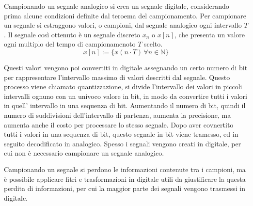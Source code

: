 \documentclass{article}
\numberwithin{equation}{subsection}
\begin{document}
Campionando un segnale analogico si crea un segnale digitale, considerando prima alcune condizioni definite dal teroema del campionamento. Per campionare un segnale si estraggono
valori, o campioni, dal segnale analogico ogni intervallo $T$. Il segnale così ottenuto è un segnale discreto $x_n$ o $x[n]$, che presenta un valore ogni multiplo del tempo di campionamenoto $T$ 
scelto. 
\begin{equation*}
    x[n]:=\{x(n\cdot T)\,\forall n\in\mathbb{N}\}
\end{equation*}

\begin{center}
\end{center}

Questi valori vengono poi convertiti in digitale assegnando un certo numero di bit per rappresentare l'intervallo massimo di valori descritti dal segnale. Questo processo 
viene chiamato quantizzazione, si divide l'intervallo dei valori in piccoli intervalli ognuno con un univoco valore in bit, in modo da convertire tutti i valori in quell'
intervallo in una sequenza di bit. Aumentando il numero di bit, quindi il numero di suddivisioni dell'intervallo di partenza, aumenta la precisione, ma aumenta anche il costo 
per processare lo stesso segnale. Dopo aver covnertito tutti i valori in una sequenza di bit, questo segnale in bit viene tramesso, ed in seguito decodificato in analogico. 
Spesso i segnali vengono creati in digitale, per cui non è necessario campionare un segnale analogico. 


Campionando un segnale si perdono le informazioni contenute tra i campioni, ma è possibile applicare fitri e trasformazioni in digitale utili da giustificare la questa perdita 
di informazioni, per cui la maggior parte dei segnali vengono trasmessi in digitale. 
\end{document}
